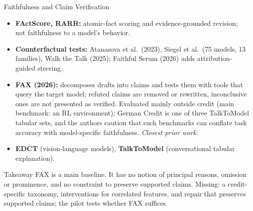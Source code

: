 \documentclass[aspectratio=169,10pt]{beamer}
\begin{document}
\begin{frame}{Faithfulness and Claim Verification}
  \vspace{1ex}
  \begin{itemize}\footnotesize
    \setlength{\itemsep}{1ex}
    \item[\textbullet] {\color{vrblue}\bfseries FActScore, RARR:} atomic-fact scoring and evidence-grounded revision; not faithfulness to a model's behavior.
    \item[\textbullet] {\color{vrblue}\bfseries Counterfactual tests:} Atanasova et al.\ (2023), Siegel et al.\ (75 models, 13 families), Walk the Talk (2025); Faithful Serum (2026) adds attribution-guided steering.
    \item[\textbullet] {\color{vrblue}\bfseries FAX (2026):} decomposes drafts into claims and tests them with tools that query the target model; refuted claims are removed or rewritten, inconclusive ones are not presented as verified. Evaluated mainly outside credit (main benchmark: an RL environment); German Credit is one of three TalkToModel tabular sets, and the authors caution that such benchmarks can conflate task accuracy with model-specific faithfulness. \emph{Closest prior work.}
    \item[\textbullet] {\color{vrblue}\bfseries EDCT} (vision-language models), {\color{vrblue}\bfseries TalkToModel} (conversational tabular explanation).
  \end{itemize}
  \vfill
  \begin{block}{Takeaway}
    FAX is a main baseline. It has no notion of principal reasons, omission or prominence, and no constraint to preserve supported claims. Missing: a credit-specific taxonomy, interventions for correlated features, and repair that preserves supported claims; the pilot tests whether FAX suffices.
  \end{block}
  \vspace{3ex}
\end{frame}
\end{document}
